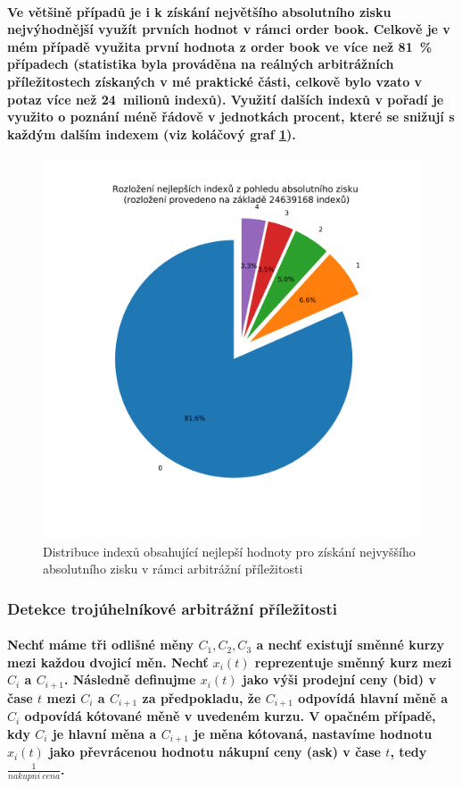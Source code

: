 \documentclass[thesis=B,czech]{FITthesis}[2019/03/21]
\begin{document}
\paragraph{
Ve většině případů je i k získání největšího absolutního zisku nejvýhodnější využít prvních hodnot v rámci order book. Celkově je v mém případě využita první hodnota z order book ve více než 81~\% případech (statistika byla prováděna na reálných arbitrážních příležitostech získaných v mé praktické části, celkově bylo vzato v potaz více než 24~milionů indexů). Využití dalších indexů v pořadí je využito o poznání méně řádově v jednotkách procent, které se snižují s každým dalším indexem (viz koláčový graf \ref{index_distribution}).
}
\begin{figure}\centering
	\includegraphics[width=1\textwidth]{images/index_distribution.png}
	\caption{Distribuce indexů obsahující nejlepší hodnoty pro získání nejvyššího absolutního zisku v rámci arbitrážní příležitosti}\label{index_distribution}
\end{figure}
\subsubsection{Detekce trojúhelníkové arbitrážní příležitosti}
\paragraph{
Nechť máme tři odlišné měny \(C_1,C_2,C_3\) a nechť existují směnné kurzy mezi každou dvojicí měn. Nechť \(x_i(t)\) reprezentuje směnný kurz mezi \(C_i\) a \(C_{i+1}\). Následně definujme \(x_i(t)\) jako výši prodejní ceny (bid) v čase \(t\) mezi \(C_i\) a \(C_{i+1}\) za předpokladu, že \(C_{i+1}\) odpovídá hlavní měně a \(C_{i}\) odpovídá kótované měně v uvedeném kurzu. V opačném případě, kdy \(C_{i}\) je hlavní měna a \(C_{i+1}\) je měna kótovaná, nastavíme hodnotu \(x_i(t)\) jako převrácenou hodnotu nákupní ceny (ask) v čase \(t\), tedy \(\frac{1}{nakupni\:cena}\).
}
\end{document}
